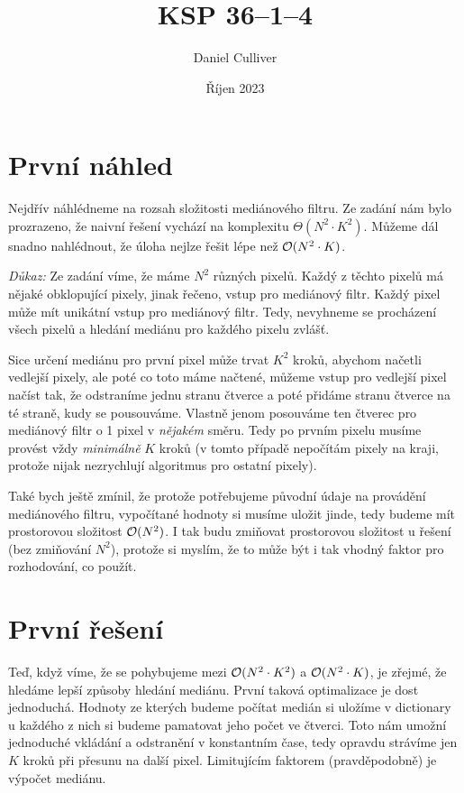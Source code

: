 \documentclass{../../../ksp}
\title{KSP 36--1--4}
\author{Daniel Culliver}
\date{Říjen 2023}
\begin{document}
\maketitle

\section*{První náhled}

Nejdřív náhlédneme na rozsah složitosti mediánového filtru. Ze zadání nám bylo prozrazeno,
že naivní řešení vychází na komplexitu $\Theta(N^2 \cdot K^2)$. Můžeme dál snadno nahlédnout,
že úloha nejlze řešit lépe než $\mathcal{O}(N^2 \cdot K)$.

\emph{Důkaz:} Ze zadání víme, že máme $N^2$ různých pixelů. Každý z těchto pixelů má nějaké
obklopující pixely, jinak řečeno, vstup pro mediánový filtr. Každý pixel může mít unikátní
vstup pro mediánový filtr. Tedy, nevyhneme se procházení všech pixelů a hledání mediánu pro každého pixelu zvlášť.

Sice určení mediánu pro první pixel může trvat $K^2$ kroků, abychom načetli vedlejší pixely,
ale poté co toto máme načtené, můžeme vstup pro vedlejší pixel načíst tak, že odstraníme jednu stranu čtverce
a poté přidáme stranu čtverce na té straně, kudy se pousouváme. Vlastně jenom posouváme ten čtverec pro mediánový filtr
o 1 pixel v \emph{nějakém} směru. Tedy po prvním pixelu musíme provést vždy \emph{minimálně} $K$ kroků
(v tomto případě nepočítám pixely na kraji, protože nijak nezrychlují algoritmus pro ostatní pixely).

Také bych ještě zmínil, že protože potřebujeme původní údaje na provádění mediánového filtru,
vypočítané hodnoty si musíme uložit jinde, tedy budeme mít prostorovou složitost $\mathcal{O}(N^2)$.
I tak budu zmiňovat prostorovou složitost u řešení (bez zmiňování $N^2$), protože si myslím, že to může být i tak vhodný
faktor pro rozhodování, co použít.

\section*{První řešení}

Teď, když víme, že se pohybujeme mezi $\mathcal{O}(N^2 \cdot K^2)$ a $\mathcal{O}(N^2 \cdot K)$, je zřejmé,
že hledáme lepší způsoby hledání mediánu. První taková optimalizace je dost jednoduchá.
Hodnoty ze kterých budeme počítat medián si uložíme v dictionary u každého z nich si budeme pamatovat
jeho počet ve čtverci. Toto nám umožní jednoduché vkládání a odstranění v konstantním čase, tedy opravdu
strávíme jen $K$ kroků při přesunu na další pixel. Limitujícím faktorem (pravděpodobně) je výpočet mediánu.
\end{document}
